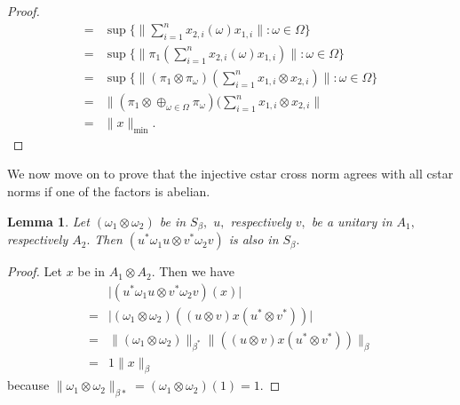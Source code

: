\documentclass{article}
\theoremstyle{plain}
\newtheorem{lemma}[theorem]{Lemma}
\theoremstyle{definition}
\theoremstyle{remark}
\begin{document}
\begin{proof}
\begin{align*}
	={}& \sup \{ \lVert \sum_{i=1}^{n} x_{2,i}(\omega) x_{1,i} \rVert
	\colon \omega \in \Omega \} \\
	={}& \sup \{ \lVert \pi_1( \sum_{i=1}^{n} x_{2,i}(\omega) x_{1,i} ) \rVert
	\colon \omega \in \Omega \} \\
	={}& \sup \{ \lVert (\pi_1 \otimes \pi_{\omega}) (\sum_{i=1}^{n} x_{1,i} \otimes x_{2,i} ) \rVert
	\colon \omega \in \Omega \} \\
	={}& \lVert (\pi_1 \otimes \oplus_{\omega \in \Omega} \pi_{\omega} )
	(\sum_{i=1}^{n} x_{1,i} \otimes x_{2,i} \rVert \\
	={}& \lVert x \rVert_{\min}.
\end{align*}
\end{proof}

We now move on to prove that the injective cstar cross norm agrees with
all cstar norms if one of the factors is abelian.

\begin{lemma}\label{lem:s_beta_unitarily_invariant}
	Let $(\omega_1 \otimes \omega_2)$ be in $S_\beta,$ 
	$u,$ respectively $v,$ be a unitary in $A_1,$ respectively $A_2.$
	Then $(u^\ast \omega_1 u \otimes v^\ast \omega_2 v)$ is also in $S_\beta.$
\end{lemma}
\begin{proof}
	Let $x$ be in $A_1 \otimes A_2.$
	Then we have
\begin{align*}
	{}& \lvert (u^\ast \omega_1 u \otimes v^\ast \omega_2 v) (x) \rvert \\
	={}& \lvert (\omega_1 \otimes \omega_2) ((u \otimes v) x (u^\ast \otimes v^\ast)) \rvert \\
	={}& \lVert (\omega_1 \otimes \omega_2) \rVert_{\beta^\ast} 
	\lVert ((u \otimes v) x (u^\ast \otimes v^\ast)) \rVert_{\beta} \\
	={}& 1 \lVert x \rVert_{\beta}
\end{align*}
because $\lVert \omega_1 \otimes \omega_2 \rVert_{\beta\ast} = (\omega_1\otimes \omega_2)(1) = 1.$
\end{proof}
\end{document}
